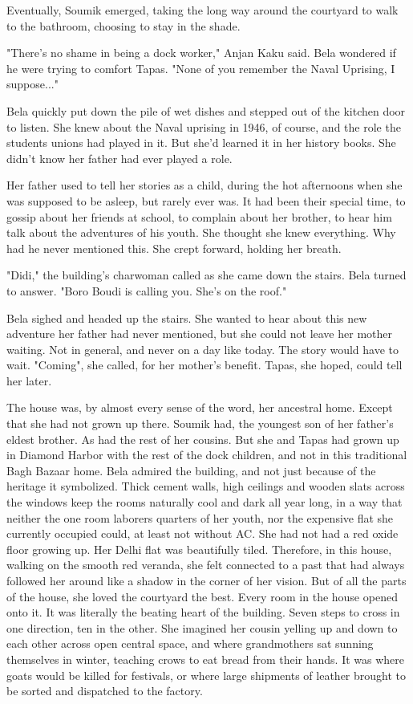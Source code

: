 \documentclass{amsart}
\begin{document}
Eventually, Soumik emerged, taking the long way around the courtyard to walk to the bathroom, choosing to stay in the shade. 

"There's no shame in being a dock worker," Anjan Kaku said. Bela wondered if he were trying to comfort Tapas. "None of you remember the Naval Uprising, I suppose..." 

Bela quickly put down the pile of wet dishes and stepped out of the kitchen door to listen. She knew about the Naval uprising in 1946, of course, and the role the students unions had played in it. But she'd learned it in her history books. She didn't know her father had ever played a role.

Her father used to tell her stories as a child, during the hot afternoons when she was supposed to be asleep, but rarely ever was. It had been their special time, to gossip about her friends at school, to complain about her brother, to hear him talk about the adventures of his youth. She thought she knew everything. Why had he never mentioned this. She crept forward, holding her breath.

"Didi," the building's charwoman called as she came down the stairs. Bela turned to answer. "Boro Boudi is calling you. She's on the roof."

Bela sighed and headed up the stairs. She wanted to hear about this new adventure her father had never mentioned, but she could not leave her mother waiting. Not in general, and never on a day like today. The story would have to wait. "Coming", she called, for her mother's benefit. Tapas, she hoped, could tell her later. 

The house was, by almost every sense of the word, her ancestral home. Except that she had not grown up there. Soumik had, the youngest son of her father's eldest brother. As had the rest of her cousins. But she and Tapas had grown up in Diamond Harbor with the rest of the dock children, and not in this traditional Bagh Bazaar home. Bela admired the building, and not just because of the heritage it symbolized. Thick cement walls, high ceilings and wooden slats across the windows keep the rooms naturally cool and dark all year long, in a way that neither the one room laborers quarters of her youth, nor the expensive flat she currently occupied could, at least not without AC. She had not had a red oxide floor growing up. Her Delhi flat was beautifully tiled. Therefore, in this house, walking on the smooth red veranda, she felt connected to a past that had always followed her around like a shadow in the corner of her vision. But of all the parts of the house, she loved the courtyard the best. Every room in the house opened onto it. It was literally the beating heart of the building. Seven steps to cross in one direction, ten in the other. She imagined her cousin yelling up and down to each other across open central space, and where grandmothers sat sunning themselves in winter, teaching crows to eat bread from their hands. It was where goats would be killed for festivals, or where large shipments of leather brought to be sorted and dispatched to the factory. 
\end{document}

